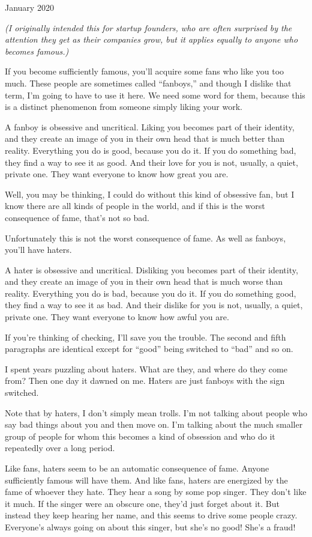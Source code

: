 January 2020

\emph{(I originally intended this for startup founders, who are often
surprised by the attention they get as their companies grow, but it
applies equally to anyone who becomes famous.)}

If you become sufficiently famous, you'll acquire some fans who like you
too much. These people are sometimes called ``fanboys,'' and though I
dislike that term, I'm going to have to use it here. We need some word
for them, because this is a distinct phenomenon from someone simply
liking your work.

A fanboy is obsessive and uncritical. Liking you becomes part of their
identity, and they create an image of you in their own head that is much
better than reality. Everything you do is good, because you do it. If
you do something bad, they find a way to see it as good. And their love
for you is not, usually, a quiet, private one. They want everyone to
know how great you are.

Well, you may be thinking, I could do without this kind of obsessive
fan, but I know there are all kinds of people in the world, and if this
is the worst consequence of fame, that's not so bad.

Unfortunately this is not the worst consequence of fame. As well as
fanboys, you'll have haters.

A hater is obsessive and uncritical. Disliking you becomes part of their
identity, and they create an image of you in their own head that is much
worse than reality. Everything you do is bad, because you do it. If you
do something good, they find a way to see it as bad. And their dislike
for you is not, usually, a quiet, private one. They want everyone to
know how awful you are.

If you're thinking of checking, I'll save you the trouble. The second
and fifth paragraphs are identical except for ``good'' being switched to
``bad'' and so on.

I spent years puzzling about haters. What are they, and where do they
come from? Then one day it dawned on me. Haters are just fanboys with
the sign switched.

Note that by haters, I don't simply mean trolls. I'm not talking about
people who say bad things about you and then move on. I'm talking about
the much smaller group of people for whom this becomes a kind of
obsession and who do it repeatedly over a long period.

Like fans, haters seem to be an automatic consequence of fame. Anyone
sufficiently famous will have them. And like fans, haters are energized
by the fame of whoever they hate. They hear a song by some pop singer.
They don't like it much. If the singer were an obscure one, they'd just
forget about it. But instead they keep hearing her name, and this seems
to drive some people crazy. Everyone's always going on about this
singer, but she's no good! She's a fraud!


